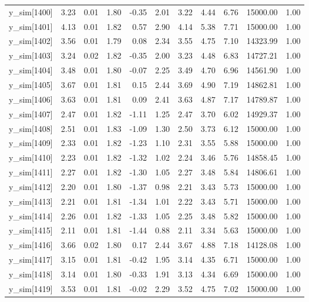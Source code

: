 \begin{table}[ht]
\begin{tabular}{rrrrrrrrrrr}
  y\_sim[1400] & 3.23 & 0.01 & 1.80 & -0.35 & 2.01 & 3.22 & 4.44 & 6.76 & 15000.00 & 1.00 \\ 
  y\_sim[1401] & 4.13 & 0.01 & 1.82 & 0.57 & 2.90 & 4.14 & 5.38 & 7.71 & 15000.00 & 1.00 \\ 
  y\_sim[1402] & 3.56 & 0.01 & 1.79 & 0.08 & 2.34 & 3.55 & 4.75 & 7.10 & 14323.99 & 1.00 \\ 
  y\_sim[1403] & 3.24 & 0.02 & 1.82 & -0.35 & 2.00 & 3.23 & 4.48 & 6.83 & 14727.21 & 1.00 \\ 
  y\_sim[1404] & 3.48 & 0.01 & 1.80 & -0.07 & 2.25 & 3.49 & 4.70 & 6.96 & 14561.90 & 1.00 \\ 
  y\_sim[1405] & 3.67 & 0.01 & 1.81 & 0.15 & 2.44 & 3.69 & 4.90 & 7.19 & 14862.81 & 1.00 \\ 
  y\_sim[1406] & 3.63 & 0.01 & 1.81 & 0.09 & 2.41 & 3.63 & 4.87 & 7.17 & 14789.87 & 1.00 \\ 
  y\_sim[1407] & 2.47 & 0.01 & 1.82 & -1.11 & 1.25 & 2.47 & 3.70 & 6.02 & 14929.37 & 1.00 \\ 
  y\_sim[1408] & 2.51 & 0.01 & 1.83 & -1.09 & 1.30 & 2.50 & 3.73 & 6.12 & 15000.00 & 1.00 \\ 
  y\_sim[1409] & 2.33 & 0.01 & 1.82 & -1.23 & 1.10 & 2.31 & 3.55 & 5.88 & 15000.00 & 1.00 \\ 
  y\_sim[1410] & 2.23 & 0.01 & 1.82 & -1.32 & 1.02 & 2.24 & 3.46 & 5.76 & 14858.45 & 1.00 \\ 
  y\_sim[1411] & 2.27 & 0.01 & 1.82 & -1.30 & 1.05 & 2.27 & 3.48 & 5.84 & 14806.61 & 1.00 \\ 
  y\_sim[1412] & 2.20 & 0.01 & 1.80 & -1.37 & 0.98 & 2.21 & 3.43 & 5.73 & 15000.00 & 1.00 \\ 
  y\_sim[1413] & 2.21 & 0.01 & 1.81 & -1.34 & 1.01 & 2.22 & 3.43 & 5.71 & 15000.00 & 1.00 \\ 
  y\_sim[1414] & 2.26 & 0.01 & 1.82 & -1.33 & 1.05 & 2.25 & 3.48 & 5.82 & 15000.00 & 1.00 \\ 
  y\_sim[1415] & 2.11 & 0.01 & 1.81 & -1.44 & 0.88 & 2.11 & 3.34 & 5.63 & 15000.00 & 1.00 \\ 
  y\_sim[1416] & 3.66 & 0.02 & 1.80 & 0.17 & 2.44 & 3.67 & 4.88 & 7.18 & 14128.08 & 1.00 \\ 
  y\_sim[1417] & 3.15 & 0.01 & 1.81 & -0.42 & 1.95 & 3.14 & 4.35 & 6.71 & 15000.00 & 1.00 \\ 
  y\_sim[1418] & 3.14 & 0.01 & 1.80 & -0.33 & 1.91 & 3.13 & 4.34 & 6.69 & 15000.00 & 1.00 \\ 
  y\_sim[1419] & 3.53 & 0.01 & 1.81 & -0.02 & 2.29 & 3.52 & 4.75 & 7.02 & 15000.00 & 1.00 \\ 

\end{tabular}
\end{table}
